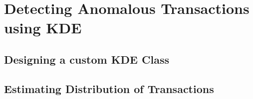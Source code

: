 \section{Detecting Anomalous Transactions using KDE}

\subsection{Designing a custom KDE Class}

\subsection{Estimating Distribution of Transactions}